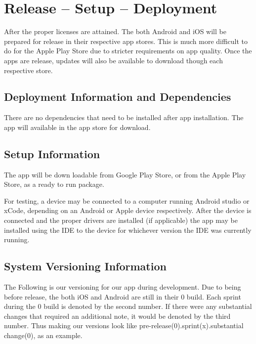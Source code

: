 
\chapter{Release -- Setup -- Deployment}
After the proper licenses are attained. The both Android and iOS will be prepared for release in their respective app stores. This is much more difficult to do for the Apple Play Store due to stricter requirements on app quality. Once the apps are release, updates will also be available to download though each respective store.


\section{Deployment Information and Dependencies}
There are no dependencies that need to be installed after app installation. The app will available in the app store for download.



\section{Setup Information}
The app will be down loadable from Google Play Store, or from the Apple Play Store, as a ready to run package.

For testing, a device may be connected to a computer running Android studio or xCode, depending on an Android or Apple device respectively. After the device is connected and the proper drivers are installed (if applicable) the app may be installed using the IDE to the device for whichever version the IDE was currently running.



\section{System  Versioning Information}
The Following is our versioning for our app during development. Due to being before release, the both iOS and Android are still in their 0 build. Each sprint during the 0 build is denoted by the second number. If there were any substantial changes that required an additional note, it would be denoted by the third number. Thus making our versions look like pre-release(0).sprint(x).substantial change(0), as an example.\\




